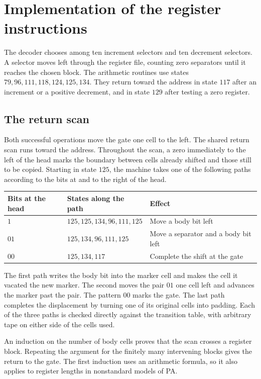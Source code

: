 \documentclass[11pt,letterpaper]{article}
\begin{document}
\section{Implementation of the register instructions}\label{sec:macros}

The decoder chooses among ten increment selectors and ten decrement
selectors. A selector moves left through the register file, counting
zero separators until it reaches the chosen block. The arithmetic
routines use states $79,96,111,118,124,125,134$. They return toward
the address in state $117$ after an increment or a positive decrement,
and in state $129$ after testing a zero register.

\subsection{The return scan}\label{sec:marker}

Both successful operations move the gate one cell to the left. The
shared return scan runs toward the address. Throughout the scan,
a zero immediately to the left of the head marks the boundary
between cells already shifted and those still to be copied.
Starting in state $125$, the machine takes one of the following
paths according to the bits at and to the right of the head.

\begin{center}
\begin{tabular}{@{}lll@{}}
\toprule
Bits at the head & States along the path & Effect \\
\midrule
$1$ & $125,125,134,96,111,125$ & Move a body bit left \\
$01$ & $125,134,96,111,125$ & Move a separator and a body bit left \\
$00$ & $125,134,117$ & Complete the shift at the gate \\
\bottomrule
\end{tabular}
\end{center}

The first path writes the body bit into the marker cell and
makes the cell it vacated the new marker. The second moves the
pair $01$ one cell left and advances the marker past the pair.
The pattern $00$ marks the gate. The last path completes the
displacement by turning one of its original cells into padding.
Each of the three paths is checked directly against the transition
table, with arbitrary tape on either side of the cells used.

An induction on the number of body cells proves that the scan
crosses a register block. Repeating the argument for the finitely
many intervening blocks gives the return to the gate. The first
induction uses an arithmetic formula, so it also applies to
register lengths in nonstandard models of PA.
\end{document}
